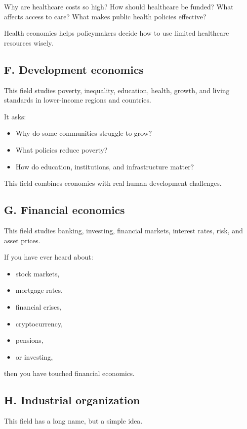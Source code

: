\documentclass[12pt]{article}
\begin{document}
Why are healthcare costs so high?  
How should healthcare be funded?  
What affects access to care?  
What makes public health policies effective?

Health economics helps policymakers decide how to use limited healthcare resources wisely.

\subsection*{F. Development economics}

This field studies poverty, inequality, education, health, growth, and living standards in lower-income regions and countries.

It asks:
\begin{itemize}[leftmargin=2em]
    \item Why do some communities struggle to grow?
    \item What policies reduce poverty?
    \item How do education, institutions, and infrastructure matter?
\end{itemize}

This field combines economics with real human development challenges.

\subsection*{G. Financial economics}

This field studies banking, investing, financial markets, interest rates, risk, and asset prices.

If you have ever heard about:
\begin{itemize}[leftmargin=2em]
    \item stock markets,
    \item mortgage rates,
    \item financial crises,
    \item cryptocurrency,
    \item pensions,
    \item or investing,
\end{itemize}

then you have touched financial economics.

\subsection*{H. Industrial organization}

This field has a long name, but a simple idea.
\end{document}
